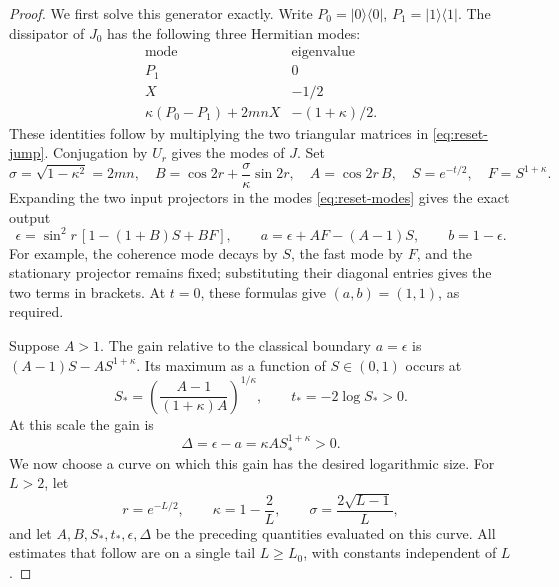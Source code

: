 \documentclass[11pt]{article}
\theoremstyle{definition}
\theoremstyle{remark}
\begin{document}
\begin{proof}
We first solve this generator exactly. Write \(P_0=|0\rangle\langle0|\), \(P_1=|1\rangle\langle1|\). The dissipator of \(J_0\) has the following three Hermitian modes:
\begin{equation}\label{eq:reset-modes}
 \begin{array}{c|c}
 \text{mode}&\text{eigenvalue}\\ \hline
 P_1&0\\
 X&-1/2\\
 \kappa(P_0-P_1)+2mnX&-(1+\kappa)/2.
 \end{array}
\end{equation}
These identities follow by multiplying the two triangular matrices in \eqref{eq:reset-jump}. Conjugation by \(U_r\) gives the modes of \(J\). Set
\begin{equation}\label{eq:reset-coefficients}
 \sigma=\sqrt{1-\kappa^2}=2mn,\quad
 B=\cos2r+\frac\sigma\kappa\sin2r,\quad A=\cos2r\,B,
 \quad S=e^{-t/2},\quad F=S^{1+\kappa}.
\end{equation}
Expanding the two input projectors in the modes \eqref{eq:reset-modes} gives the exact output
\begin{equation}\label{eq:reset-output}
 \epsilon=\sin^2r\,[1-(1+B)S+BF],\qquad
 a=\epsilon+AF-(A-1)S,\qquad b=1-\epsilon.
\end{equation}
For example, the coherence mode decays by \(S\), the fast mode by \(F\), and the stationary projector remains fixed; substituting their diagonal entries gives the two terms in brackets. At \(t=0\), these formulas give \((a,b)=(1,1)\), as required.

Suppose \(A>1\). The gain relative to the classical boundary \(a=\epsilon\) is \((A-1)S-AS^{1+\kappa}\). Its maximum as a function of \(S\in(0,1)\) occurs at
\begin{equation}\label{eq:optimal-reset-scale}
 S_* =\left(\frac{A-1}{(1+\kappa)A}\right)^{1/\kappa},
 \qquad t_*=-2\log S_*>0.
\end{equation}
At this scale the gain is
\begin{equation}\label{eq:reset-gain}
 \Delta=\epsilon-a=\kappa A S_*^{1+\kappa}>0.
\end{equation}
We now choose a curve on which this gain has the desired logarithmic size. For \(L>2\), let
\begin{equation}\label{eq:reset-schedule}
 r=e^{-L/2},\qquad \kappa=1-\frac2L,
 \qquad \sigma=\frac{2\sqrt{L-1}}L,
\end{equation}
and let \(A,B,S_*,t_*,\epsilon,\Delta\) be the preceding quantities evaluated on this curve. All estimates that follow are on a single tail \(L\geq L_0\), with constants independent of \(L\).


\end{proof}
\end{document}
